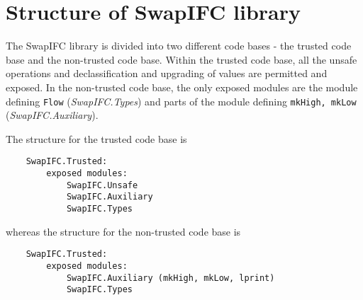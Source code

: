 \chapter{Structure of SwapIFC library}
\label{app:library_structure}
The SwapIFC library is divided into two different code bases - the trusted code base and the non-trusted code base. Within the trusted code base, all the unsafe operations and declassification and upgrading of values are permitted and exposed. In the non-trusted code base, the only exposed modules are the module defining {\tt Flow} (\emph{SwapIFC.Types}) and parts of the module defining {\tt mkHigh, mkLow} (\emph{SwapIFC.Auxiliary}).

The structure for the trusted code base is
\begin{verbatim}
    SwapIFC.Trusted:
        exposed modules:
            SwapIFC.Unsafe
            SwapIFC.Auxiliary
            SwapIFC.Types
\end{verbatim}
whereas the structure for the non-trusted code base is
\begin{verbatim}
    SwapIFC.Trusted:
        exposed modules:
            SwapIFC.Auxiliary (mkHigh, mkLow, lprint)
            SwapIFC.Types
\end{verbatim}
